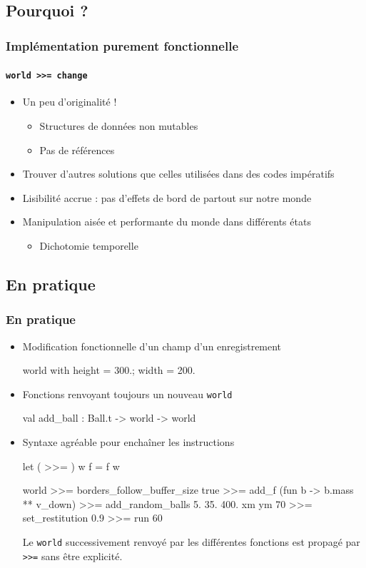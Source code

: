 \documentclass[xcolor=x11names,compress,11pt]{beamer}
\renewcommand{\(}{\begin{columns}}
\renewcommand{\)}{\end{columns}}
\newcommand{\<}[1]{\begin{column}{#1}}
\renewcommand{\>}{\end{column}}
\begin{document}
\subsection*{Pourquoi ?}

\begin{frame}
\frametitle{Implémentation purement fonctionnelle}
\framesubtitle{\texttt{world >>= change}}

\begin{itemize}
\item Un peu d'originalité !
  \begin{itemize}
  \item Structures de données non mutables
  \item Pas de références
  \end{itemize}
\item Trouver d'autres solutions que celles utilisées dans des codes
  impératifs
\item Lisibilité accrue : pas d'effets de bord de partout sur notre monde
\item Manipulation aisée et performante du monde dans différents états
  \begin{itemize}
  \item Dichotomie temporelle
  \end{itemize}
\end{itemize}

\end{frame}

\subsection*{En pratique}

\begin{frame}[fragile]
\frametitle{\small En pratique}

\begin{itemize}
\item Modification fonctionnelle d'un champ d'un enregistrement
  \begin{ocamlcode}
    {world with height = 300.; width = 200.}
  \end{ocamlcode}
\item Fonctions renvoyant toujours un nouveau \texttt{world}
  \begin{ocamlcode}
    val add_ball : Ball.t -> world -> world
  \end{ocamlcode}
\item Syntaxe agréable pour enchaîner les instructions
  \begin{ocamlcode}
    let ( >>= ) w f = f w

    world >>=
      borders_follow_buffer_size true >>=
      add_f (fun b -> b.mass ** v_down) >>=
      add_random_balls 5. 35. 400. xm ym 70 >>=
      set_restitution 0.9 >>=
      run 60
  \end{ocamlcode}
{\footnotesize
  Le \texttt{world} successivement renvoyé par les différentes
  fonctions est propagé par \texttt{>>=} sans être explicité.}
\end{itemize}

\end{frame}
\end{document}
